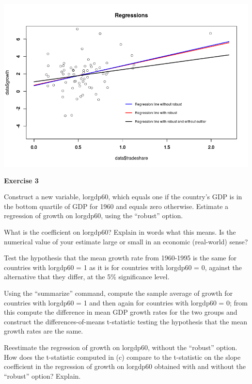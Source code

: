 \documentclass[12pt]{article}
\begin{document}
\includegraphics[width=1\textwidth]{Rplot1.png}

\textbf{Exercise 3}

Construct a new variable, lorgdp60, which equals one if the country’s GDP is in the
bottom quartile of GDP for 1960 and equals zero otherwise. Estimate a regression of
growth on lorgdp60, using the “robust” option.

\begin{list}{)~}{}
\item
What is the coefficient on lorgdp60? Explain in words what this means. Is the
numerical value of your estimate large or small in an economic (real-world) sense?
\item
Test the hypothesis that the mean growth rate from 1960-1995 is the same for countries with lorgdp60 = 1 as it is for countries with lorgdp60 = 0, against the
alternative that they differ, at the 5\% significance level.
\item
Using the “summarize” command, compute the sample average of growth for
countries with lorgdp60 = 1 and then again for countries with lorgdp60 = 0; from
this compute the difference in mean GDP growth rates for the two groups and
construct the differences-of-means t-statistic testing the hypothesis that the mean
growth rates are the same.
\item
Reestimate the regression of growth on lorgdp60, without the “robust” option. How
does the t-statistic computed in (c) compare to the t-statistic on the slope coefficient in the regression of growth on lorgdp60 obtained with and without the “robust”
option? Explain.
\end{list}
\end{document}
